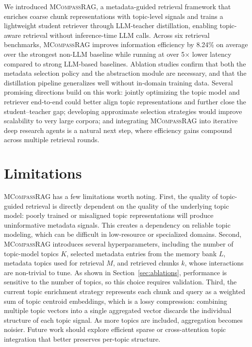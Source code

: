 \documentclass{llmxive}
\providecommand{\name}[1]{\textsc{MCompassRAG}\xspace}
\begin{document}
We introduced \name{}, a metadata-guided retrieval framework that enriches coarse chunk representations with topic-level signals and trains a lightweight student retriever through LLM-teacher distillation, enabling topic-aware retrieval without inference-time LLM calls. Across six retrieval benchmarks, \name{} improves information efficiency by 8.24\% on average over the strongest non-LLM baseline while running at over 5$\times$ lower latency compared to strong LLM-based baselines. Ablation studies confirm that both the metadata selection policy and the abstraction module are necessary, and that the distillation pipeline generalizes well without in-domain training data. Several promising directions build on this work: jointly optimizing the topic model and retriever end-to-end could better align topic representations and further close the student--teacher gap; developing approximate selection strategies would improve scalability to very large corpora; and integrating \name{} into iterative deep research agents is a natural next step, where efficiency gains compound across multiple retrieval rounds.


\section*{Limitations}
\name{} has a few limitations worth noting. First, the quality of topic-guided retrieval is directly dependent on the quality of the underlying topic model: poorly trained or misaligned topic representations will produce uninformative metadata signals. This creates a dependency on reliable topic modeling, which can be difficult in low-resource or specialized domains. Second, \name{} introduces several hyperparameters, including the number of topic-model topics $K$, selected metadata entries from the memory bank $L$, metadata topics used for retrieval $M$, and retrieved chunks $k$, whose interactions are non-trivial to tune. As shown in Section~\ref{sec:ablations}, performance is sensitive to the number of topics, so this choice requires validation. Third, the current topic enrichment strategy represents each chunk and query as a weighted sum of topic centroid embeddings, which is a lossy compression: combining multiple topic vectors into a single aggregated vector discards the individual structure of each topic signal. As more topics are included, aggregation becomes noisier. Future work should explore efficient sparse or cross-attention topic integration that better preserves per-topic structure.
\end{document}
